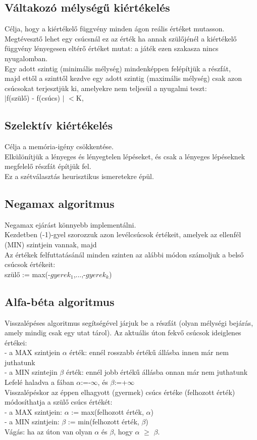 \documentclass{article}
\begin{document}
	 \subsection{Váltakozó mélységű kiértékelés}
	 Célja, hogy a kiértékelő függvény minden ágon reális értéket mutasson. Megtévesztő lehet egy csúcsnál ez az érték ha annak szülőjénél a kiértékelő függvény lényegesen eltérő értéket mutat: a játék ezen szakasza nincs nyugalomban.\\
	 Egy adott szintig (minimális mélység) mindenképpen felépítjük a részfát,\\
	 majd ettől a szinttől kezdve egy adott szintig (maximális mélység) csak azon csúcsokat terjesztjük ki, amelyekre nem teljesül a nyugalmi teszt: \\
	 $|$f(szülő) - f(csúcs) $|$ $<$K,
	 
	 \subsection{Szelektív kiértékelés}
	 Célja a memória-igény csökkentése.\\
	 Elkülönítjük a lényeges és lényegtelen lépéseket, és csak a lényeges lépéseknek megfelelő részfát építjük fel.\\
	 Ez a szétválasztás heurisztikus ismeretekre épül.\\
	 
	 \newpage
	 \subsection{Negamax algoritmus}
	 Negamax ejárást könnyebb implementálni.\\
	 Kezdetben (-1)-gyel szorozzuk azon levélcsúcsok értékeit, amelyek az ellenfél (MIN) szintjein vannak, majd\\
	 Az értékek felfuttatásánál minden szinten az alábbi módon számoljuk a belső csúcsok értékeit:\\
	 szülő := max(-$gyerek_1$,...,-$gyerek_k$)
	 
	 \subsection{Alfa-béta algoritmus}
	 Visszalépéses algoritmus segítségével járjuk be a részfát (olyan mélységi bejárás, amely mindig csak egy utat tárol). Az aktuális úton fekvő csúcsok ideiglenes értékei:\\
	 - a MAX szintjein $\alpha$ érték: ennél rosszabb értékű állásba innen már nem juthatunk\\
	 - a MIN szintejin $\beta$ érték: ennél jobb értékű állásba onnan már nem juthatunk\\
	 Lefelé haladva a fában $\alpha$:=-$\infty$, és $\beta$:=+$\infty$\\
	 Visszalépéskor az éppen elhagyott (gyermek) csúcs értéke (felhozott érték) módosíthatja a szülő csúcs értékét:\\
	 - a MAX szintjein: $\alpha$ := max(felhozott érték, $\alpha$)\\
	 - a MIN szintjein: $\beta$ := min(felhozott érték, $\beta$)\\
	 Vágás: ha az úton van olyan $\alpha$ és $\beta$, hogy $\alpha$ $\geq$ $\beta$.
	 
\end{document}
